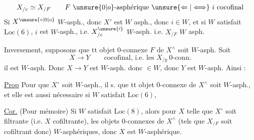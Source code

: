 \[
 X_{/e}\simeq X_{/F}\qquad F\ \unsure{0|o}\text{-asphérique}\ \unsure{\Leftarrow|\Longleftrightarrow}\ i\ \text{cocofinal}
\]
Si $X^{\unsure{\circ|0|o}}$  $W$-asph., donc  $X'$ est $W$ asph., donc $i\in W$, et si $W$ satisfait $\mathrm{Loc}(6)$, $i$ est $W$-asph., i.e. $X^{\unsure{\prime}}_{/e}$ $W$-asph. i.e. $X_{/F}$ $W$ asph.

Inversement, supposons que tt objet $0$-connexe $F$ de $X^\wedge$ soit $W$-asph. Soit
\[
 X\longrightarrow Y\qquad\text{cocofinal, i.e. les }X_{/y}\ 0\text{-conn.}
\]
    il est $W$-asph. Donc $X\to Y$ est $W$-asph. donc $\in W$, donc $Y$ est $W$-asph. Ainsi :

\uline{Prop}  Pour que $X^\circ$ soit   $W$-asph., il  s. que tt objet $0$-connexe de $X^\wedge$ soit $W$-asph., et elle est aussi nécessaire si $W$  satisfait $\mathrm{Loc}(6)$,

\uline{Cor.} (Pour mémoire)  Si  $W$ satisfait $\mathrm{Loc}(8)$, alors pour  $X$ telle que $X^\circ$ soit filtrante (i.e. $X$ cofiltrante), les objets $0$-connexes  de $X^\wedge$  (tels que $X_{/F}$ soit  cofiltrant donc) $W$-asphériques, donc $X$ est  $W$-asphérique.

